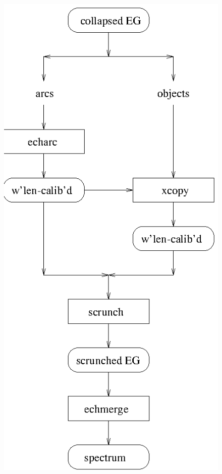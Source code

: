 \begin{latexonly}
\begin{figure}[htb]
\begin{center}
\includegraphics{sun86_ech4.eps}
\end{center}
\end{figure}
\end{latexonly}

